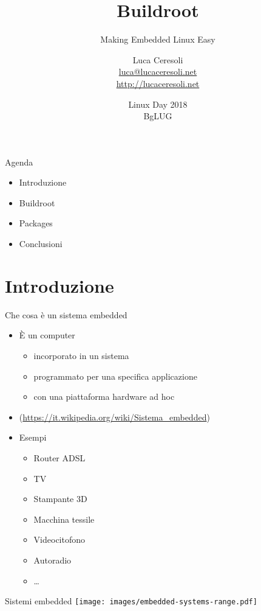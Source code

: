 \documentclass[xetex,table]{beamer}
\title{Buildroot}
\subtitle{Making Embedded Linux Easy}
\author{Luca Ceresoli\\
  \href{mailto:luca@lucaceresoli.net}{luca@lucaceresoli.net}\\
  \url{http://lucaceresoli.net}
}
\date{Linux Day 2018\\
  BgLUG}
\begin{document}
\maketitle

\begin{frame}{Agenda}
  \begin{itemize}
  \item Introduzione
  \item Buildroot
  \item Packages
  \item Conclusioni
  \end{itemize}
\end{frame}

\section{Introduzione}

\begin{frame}{Che cosa è un sistema embedded}
  \begin{itemize}
    \pause\item È un computer
    \begin{itemize}
      \pause\item {\color{red} incorporato} in un sistema
      \pause\item programmato per {\color{blue} una specifica applicazione}
      \pause\item con una piattaforma {\color[rgb]{0,0.5,0} hardware ad hoc}
    \end{itemize}
  \item[] {\tiny(\url{https://it.wikipedia.org/wiki/Sistema_embedded})}
    \pause\item Esempi
    \begin{itemize}
      \pause\item Router ADSL
      \pause\item TV
      \pause\item Stampante 3D
      \pause\item Macchina tessile
      \pause\item Videocitofono
      \pause\item Autoradio
      \pause\item\dots
    \end{itemize}
  \end{itemize}
\end{frame}

\begin{frame}{Sistemi embedded}
  \center\texttt{[image: images/embedded-systems-range.pdf]}
\end{frame}
\end{document}
